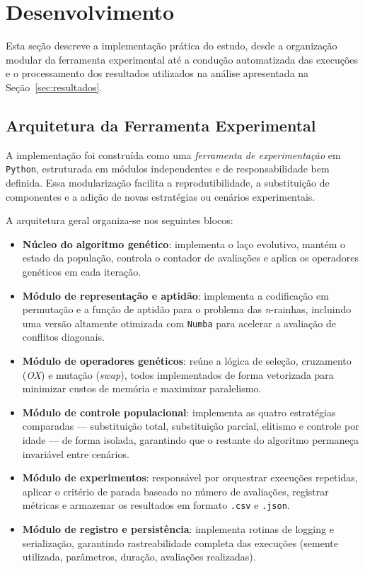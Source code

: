\section{Desenvolvimento}
\label{sec:desenvolvimento}

Esta seção descreve a implementação prática do estudo, desde a organização modular da ferramenta experimental até a condução automatizada das execuções e o processamento dos resultados utilizados na análise apresentada na Seção~\ref{sec:resultados}.

\subsection{Arquitetura da Ferramenta Experimental}

A implementação foi construída como uma \emph{ferramenta de experimentação} em \texttt{Python}, estruturada em módulos independentes e de responsabilidade bem definida. Essa modularização facilita a reprodutibilidade, a substituição de componentes e a adição de novas estratégias ou cenários experimentais.

A arquitetura geral organiza-se nos seguintes blocos:

\begin{itemize}
    \item \textbf{Núcleo do algoritmo genético}:
    implementa o laço evolutivo, mantém o estado da população, controla o contador de avaliações e aplica os operadores genéticos em cada iteração.
    
    \item \textbf{Módulo de representação e aptidão}:
    implementa a codificação em permutação e a função de aptidão para o problema das \textit{n}-rainhas, incluindo uma versão altamente otimizada com \texttt{Numba} para acelerar a avaliação de conflitos diagonais.

    \item \textbf{Módulo de operadores genéticos}:
    reúne a lógica de seleção, cruzamento (\textit{OX}) e mutação (\textit{swap}), todos implementados de forma vetorizada para minimizar custos de memória e maximizar paralelismo.

    \item \textbf{Módulo de controle populacional}:
    implementa as quatro estratégias comparadas — substituição total, substituição parcial, elitismo e controle por idade — de forma isolada, garantindo que o restante do algoritmo permaneça invariável entre cenários.

    \item \textbf{Módulo de experimentos}:
    responsável por orquestrar execuções repetidas, aplicar o critério de parada baseado no número de avaliações, registrar métricas e armazenar os resultados em formato \texttt{.csv} e \texttt{.json}.

    \item \textbf{Módulo de registro e persistência}:
    implementa rotinas de logging e serialização, garantindo rastreabilidade completa das execuções (semente utilizada, parâmetros, duração, avaliações realizadas).
\end{itemize}

